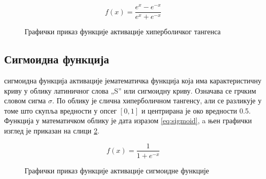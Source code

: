 \documentclass[a4paper, 12pt, master, utf8]{etf}
\begin{document}
\begin{equation}
    f(x) = \frac{e^{x} - e^{-x}}{e^{x} + e^{-x}}
    \label{eq:tanh}
\end{equation}

\begin{figure}[h]
    \centering
    \caption{Графички приказ функције активације хиперболичког тангенса}
    \label{fig:tanh}
\end{figure}

\subsection{Сигмоидна функција}
\label{sec:243}
сигмоидна функција активације јематематичка функција која има карактеристичну криву у облику латиничног слова „S” или сигмоидну криву.
Означава се грчким словом сигма $\sigma$. По облику је слична хиперболичном тангенсу, али се разликује у томе што скупља вредности у опсег $[0,1]$ и центрирана је око вредности 0.5.
Функција у математичком облику је дата изразом \ref{eq:sigmoid}, a њен графички изглед је приказан на слици \ref{fig:sigmoid}.

\begin{equation}
    f(x) = \frac{1}{1 + e^{-x}}
    \label{eq:sigmoid}
\end{equation}

\begin{figure}[h]
    \centering
    \caption{Графички приказ функције активације сигмоидне функције}
    \label{fig:sigmoid}
\end{figure}
\end{document}

